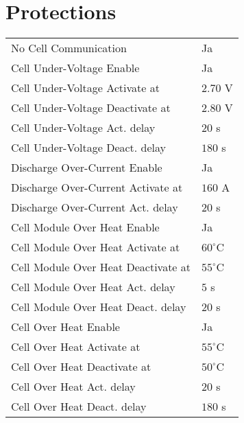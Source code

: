 \section*{Protections}
\begin{tabular}{p{11cm}p{2cm}}
	No Cell Communication & Ja \\
	Cell Under-Voltage Enable & Ja \\
	Cell Under-Voltage Activate at & $2.70$ V \\
	Cell Under-Voltage Deactivate at & $2.80$ V \\
	Cell Under-Voltage Act. delay & $20$ s \\
	Cell Under-Voltage Deact. delay & $180$ s \\
	Discharge Over-Current Enable & Ja \\
	Discharge Over-Current Activate at & $160$ A \\
	Discharge Over-Current Act. delay & $20$ s \\
	Cell Module Over Heat Enable & Ja \\
	Cell Module Over Heat Activate at & $60^\circ$C \\
	Cell Module Over Heat Deactivate at & $55^\circ$C \\
	Cell Module Over Heat Act. delay & $5$ s \\
	Cell Module Over Heat Deact. delay & $20$ s \\
	Cell Over Heat Enable & Ja \\
	Cell Over Heat Activate at & $55^\circ$C \\
	Cell Over Heat Deactivate at & $50^\circ$C \\
	Cell Over Heat Act. delay & $20$ s \\
	Cell Over Heat Deact. delay & $180$ s
\end{tabular}

